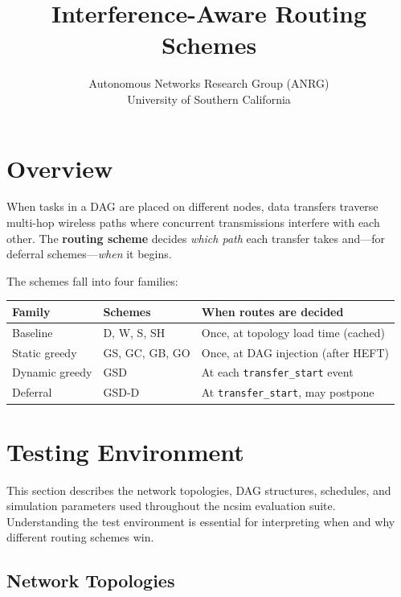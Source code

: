 \documentclass[11pt]{article}
\title{Interference-Aware Routing Schemes}
\author{Autonomous Networks Research Group (ANRG)\\University of Southern California}
\date{}
\begin{document}
\maketitle
\tableofcontents
\newpage

\section{Overview}

When tasks in a DAG are placed on different nodes, data transfers traverse
multi-hop wireless paths where concurrent transmissions interfere with each
other.  The \textbf{routing scheme} decides \emph{which path} each transfer
takes and---for deferral schemes---\emph{when} it begins.

The schemes fall into four families:

\begin{table}[h]
\centering
\begin{tabular}{llp{5.5cm}}
\toprule
\textbf{Family} & \textbf{Schemes} & \textbf{When routes are decided} \\
\midrule
Baseline        & D, W, S, SH      & Once, at topology load time (cached) \\
Static greedy   & GS, GC, GB, GO   & Once, at DAG injection (after HEFT) \\
Dynamic greedy  & GSD              & At each \texttt{transfer\_start} event \\
Deferral        & GSD-D            & At \texttt{transfer\_start}, may postpone \\
\bottomrule
\end{tabular}
\end{table}

\section{Testing Environment}

This section describes the network topologies, DAG structures, schedules,
and simulation parameters used throughout the ncsim evaluation suite.
Understanding the test environment is essential for interpreting when and
why different routing schemes win.

\subsection{Network Topologies}
\end{document}
